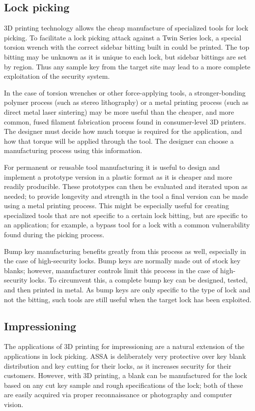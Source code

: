 \documentclass{acm_proc_article-sp}
\begin{document}
\subsection{Lock picking}
3D printing technology allows the cheap manufacture of specialized tools for lock picking. To facilitate a lock picking attack against a Twin Series lock, a special torsion wrench with the correct sidebar bitting built in could be printed. The top bitting may be unknown as it is unique to each lock, but sidebar bittings are set by region. Thus any sample key from the target site may lead to a more complete exploitation of the security system.

In the case of torsion wrenches or other force-applying tools, a stronger-bonding polymer process (such as stereo lithography) or a metal printing process (such as direct metal laser sintering) may be more useful than the cheaper, and more common, fused filament fabrication process found in consumer-level 3D printers. The designer must decide how much torque is required for the application, and how that torque will be applied through the tool. The designer can choose a manufacturing process using this information.

For permanent or reusable tool manufacturing it is useful to design and implement a prototype version in a plastic format as it is cheaper and more readily producible. These prototypes can then be evaluated and iterated upon as needed; to provide longevity and strength in the tool a final version can be made using a metal printing process. This might be especially useful for creating specialized tools that are not specific to a certain lock bitting, but are specific to an application; for example, a bypass tool for a lock with a common vulnerability found during the picking process.

Bump key manufacturing benefits greatly from this process as well, especially in the case of high-security locks. Bump keys are normally made out of stock key blanks; however, manufacturer controls limit this process in the case of high-security locks. To circumvent this, a complete bump key can be designed, tested, and then printed in metal. As bump keys are only specific to the type of lock and not the bitting, such tools are still useful when the target lock has been exploited.

\subsection{Impressioning}
The applications of 3D printing for impressioning are a natural extension of the applications in lock picking. ASSA is deliberately very protective over key blank distribution and key cutting for their locks, as it increases security for their customers. However, with 3D printing, a blank can be manufactured for the lock based on any cut key sample and rough specifications of the lock; both of these are easily acquired via proper reconnaissance or photography and computer vision.
\end{document}
